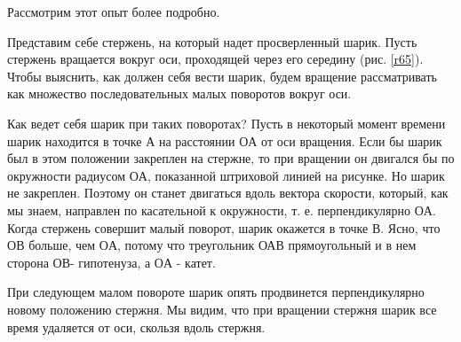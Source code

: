 \documentclass[a5paper, 10pt]{diss_4}
\renewcommand{\'}{\,'}
\begin{document}
  Рассмотрим этот опыт более подробно.

  Представим себе стержень, на который надет просверленный шарик. Пусть
стержень вращается вокруг оси, проходящей через его середину (рис. \ref{r65}). Чтобы
выяснить, как должен себя вести шарик, будем вращение рассматривать как
множество последовательных малых поворотов вокруг оси.

  Как ведет себя шарик при таких поворотах? Пусть в некоторый момент
времени шарик находится в точке $А$ на расстоянии $ОА$ от оси вращения. Если бы
шарик был в этом положении закреплен на стержне, то при вращении он двигался бы
по окружности радиусом $ОА$, показанной штриховой линией на рисунке. Но шарик не
закреплен. Поэтому он станет двигаться вдоль вектора скорости, который, как мы
знаем, направлен по касательной к окружности, т. е. перпендикулярно $ОА$. Когда
стержень совершит малый поворот, шарик окажется в точке $В$. Ясно, что $ОВ$
больше, чем $ОА$, потому что треугольник ОАВ прямоугольный и в нем сторона $ОВ$-
гипотенуза, а $ОА$ - катет.

  При следующем малом повороте шарик опять продвинется перпендикулярно
новому положению стержня. Мы видим, что при вращении стержня шарик все время
удаляется от оси, скользя вдоль стержня.
\end{document}
